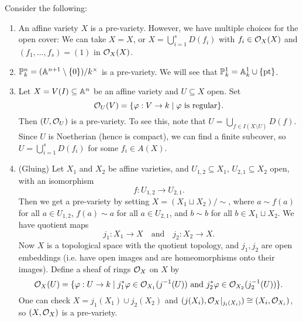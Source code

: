 \begin{example}
  Consider the following:
  \begin{enumerate}
    \item An affine variety $X$ is a
      pre-variety.
      However, we have multiple
      choices for the open cover:
      We can take $X = X$, or
      $X = \bigcup_{i = 1}^s D(f_i)$
      with $f_i \in \mathcal{O}_X(X)$ and
      $(f_1, \dots, f_s) = (1)$
      in $\mathcal{O}_X(X)$.
    \item $\mathbb{P}^n_k = (\mathbb{A}^{n + 1} \setminus \{0\}) / k^\times$ is
      a pre-variety. We will see that
      $\mathbb{P}^1_k = \mathbb{A}^1_k \cup \{\mathrm{pt}\}$.
    \item Let $X = V(I) \subseteq \mathbb{A}^n$
      be an affine variety and $U \subseteq X$ open.
      Set
      \[
        \mathcal{O}_U(V) = \{\varphi : V \to k \mid \varphi \text{ is regular}\}.
      \]
      Then $(U, \mathcal{O}_U)$ is a pre-variety.
      To see this, note that
      $U = \bigcup_{f \in I(X \setminus U)} D(f)$.
      Since $U$ is Noetherian (hence is
      compact), we can find a finite subcover,
      so $U = \bigcup_{i = 1}^s D(f_i)$
      for some $f_i \in A(X)$.
    \item (Gluing) Let
      $X_1$ and $X_2$ be affine varieties,
      and $U_{1,2} \subseteq X_1$,
      $U_{2,1} \subseteq X_2$ open, with
      an isomorphism
      \[
        f : U_{1, 2} \longrightarrow U_{2, 1}.
      \]
      Then we get a pre-variety by
      setting
      $X = (X_1 \sqcup X_2) / {\sim}$,
      where
      $a \sim f(a)$ for all $a \in U_{1, 2}$,
      $f(a) \sim a$ for all
      $a \in U_{2, 1}$, and
      $b \sim b$ for all $b \in X_1 \sqcup X_2$.
      We have quotient maps
      \[
        j_1 : X_1 \longrightarrow X
        \quad \text{and} \quad
        j_2 : X_2 \longrightarrow X.
      \]
      Now $X$ is a topological space
      with the quotient topology, and 
      $j_1, j_2$ are open embeddings
      (i.e. have open images and are
      homeomorphisms onto their images).
      Define a sheaf of rings
      $\mathcal{O}_X$ on $X$ by
      \[
        \mathcal{O}_X(U)
        = \{\varphi : U \to k \mid j_1^* \varphi \in \mathcal{O}_{X_1}(j^{-1}(U)) \text{ and } j_2^* \varphi \in \mathcal{O}_{X_2}(j_2^{-1}(U))\}.
      \]
      One can check
      $X = j_1(X_1) \cup j_2(X_2)$ and
      $(j(X_i), \mathcal{O}_X|_{j_i(X_i)}) \cong (X_i, \mathcal{O}_{X_i})$,
      so $(X, \mathcal{O}_X)$ is a pre-variety.
  \end{enumerate}
\end{example}


